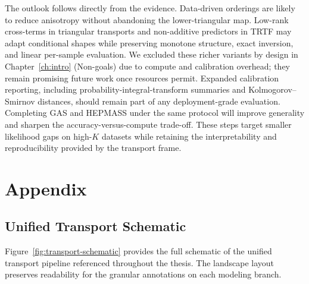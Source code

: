 \documentclass[11pt,a4paper,twoside]{book}\usepackage[]{graphicx}\usepackage[]{xcolor}
\begin{document}
The outlook follows directly from the evidence. Data-driven orderings are likely to reduce anisotropy without abandoning the lower-triangular map. Low-rank cross-terms in triangular transports and non-additive predictors in TRTF may adapt conditional shapes while preserving monotone structure, exact inversion, and linear per-sample evaluation. We excluded these richer variants by design in Chapter~\ref{ch:intro} (Non-goals) due to compute and calibration overhead; they remain promising future work once resources permit. Expanded calibration reporting, including probability-integral-transform summaries and Kolmogorov--Smirnov distances, should remain part of any deployment-grade evaluation. Completing GAS and HEPMASS under the same protocol will improve generality and sharpen the accuracy-versus-compute trade-off. These steps target smaller likelihood gaps on high-$K$ datasets while retaining the interpretability and reproducibility provided by the transport frame.





\appendix




\chapter{Appendix}\label{ch:appendix}

\section{Unified Transport Schematic}\label{app:transport-schematic-figure}
Figure~\ref{fig:transport-schematic} provides the full schematic of the unified transport pipeline referenced throughout the thesis. The landscape layout preserves readability for the granular annotations on each modeling branch.
\end{document}
